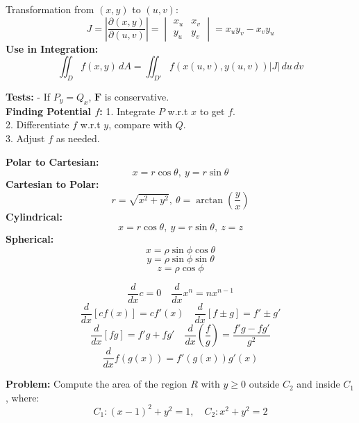 \documentclass[9pt]{article}
\begin{document}
\begin{multicols}{2}
\begin{tcolorbox}[title=\textbf{Jacobian Determinant}, colframe=lightgreen]
Transformation from \( (x, y) \) to \( (u, v) \):
\[ J = \left| \frac{\partial(x, y)}{\partial(u, v)} \right| = 
\begin{vmatrix}
x_u & x_v \\
y_u & y_v
\end{vmatrix}
= x_u y_v - x_v y_u \]
\textbf{Use in Integration:}
\[ \iint_D f(x, y)\, dA = \iint_{D'} f(x(u, v), y(u, v)) |J|\, du\, dv \]
\end{tcolorbox}

\begin{tcolorbox}[title=\textbf{Conservative Vector Fields}, colframe=lightblue]
\textbf{Tests:}
- If \( P_y = Q_x \), \( \mathbf{F} \) is conservative. \\
\textbf{Finding Potential \( f \):}
1. Integrate \( P \) w.r.t \( x \) to get \( f \). \\
2. Differentiate \( f \) w.r.t \( y \), compare with \( Q \). \\
3. Adjust \( f \) as needed.
\end{tcolorbox}

\begin{tcolorbox}[title=\textbf{Coordinate Transformations}, colframe=lightgreen]
\textbf{Polar to Cartesian:}
\[ x = r \cos \theta,\ y = r \sin \theta \]
\textbf{Cartesian to Polar:}
\[ r = \sqrt{x^2 + y^2},\ \theta = \arctan \left( \frac{y}{x} \right) \]
\textbf{Cylindrical:}
\[ x = r \cos \theta,\ y = r \sin \theta,\ z = z \]
\textbf{Spherical:}
\[ x = \rho \sin \phi \cos \theta \]
\[ y = \rho \sin \phi \sin \theta \]
\[ z = \rho \cos \phi \]
\end{tcolorbox}

\begin{tcolorbox}[title=\textbf{Derivative Rules}, colframe=lightblue]
\[ \frac{d}{dx} c = 0 \quad \frac{d}{dx} x^n = nx^{n-1} \]
\[ \frac{d}{dx} [cf(x)] = c f'(x) \quad \frac{d}{dx} [f \pm g] = f' \pm g' \]
\[ \frac{d}{dx} [fg] = f'g + fg' \quad \frac{d}{dx} \left( \frac{f}{g} \right) = \frac{f'g - fg'}{g^2} \]
\[ \frac{d}{dx} f(g(x)) = f'(g(x)) g'(x) \]
\end{tcolorbox}

\begin{tcolorbox}[title=\textbf{Example: Computing Area Between Circles}, colframe=lightpink]
    \textbf{Problem:} Compute the area of the region \( R \) with \( y \geq 0 \) outside \( C_2 \) and inside \( C_1 \), where:
    \[ C_1: (x - 1)^2 + y^2 = 1, \quad C_2: x^2 + y^2 = 2 \]
    

\end{tcolorbox}
\end{multicols}
\end{document}
